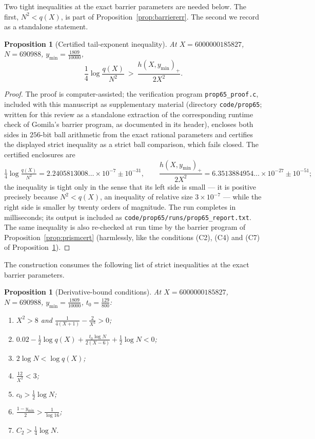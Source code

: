 \documentclass[11pt]{article}
\newtheorem{proposition}[theorem]{Proposition}
\theoremstyle{definition}
\begin{document}
Two tight inequalities at the exact barrier parameters are needed
below. The first, $N^2<q(X)$, is part of
Proposition~\ref{prop:barriererr}. The second we record as a
standalone statement.

\begin{proposition}[Certified tail-exponent inequality]\label{prop:tailexp}
At $X=6000000185827$, $N=690988$, $y_{\min}=\frac{1809}{10000}$,
\[
\frac14\log\frac{q(X)}{N^2}\ >\ \frac{h(X,y_{\min})_+}{2X^2} .
\]
\end{proposition}

\begin{proof}
The proof is computer-assisted; the verification program
\texttt{prop65\_proof.c}, included with this manuscript as
supplementary material (directory \texttt{code/prop65}; written for
this review as a standalone extraction of the corresponding runtime
check of Gomila's barrier program, as documented in its header),
encloses both sides in $256$-bit ball arithmetic from the exact
rational parameters and certifies the displayed strict inequality
as a strict ball comparison, which fails closed. The certified
enclosures are
\[
\tfrac14\log\tfrac{q(X)}{N^2}
=2.2405813008\ldots\times10^{-7}\pm10^{-31},
\qquad
\frac{h(X,y_{\min})_+}{2X^2}
=6.3513884954\ldots\times10^{-27}\pm10^{-51};
\]
the inequality is tight only in the sense that its left side is
small --- it is positive precisely because $N^2<q(X)$, an
inequality of relative size $3\times10^{-7}$ --- while the right
side is smaller by twenty orders of magnitude. The run completes in
milliseconds; its output is included as
\texttt{code/prop65/runs/prop65\_report.txt}. The same inequality
is also re-checked at run time by the barrier program of
Proposition~\ref{prop:prismcert} (harmlessly, like the conditions
(C2), (C4) and (C7) of Proposition~\ref{prop:derivgates}).
\end{proof}

The construction consumes the following list of strict inequalities
at the exact barrier parameters.

\begin{proposition}[Derivative-bound conditions]\label{prop:derivgates}
At $X=6000000185827$, $N=690988$, $y_{\min}=\frac{1809}{10000}$,
$t_0=\frac{129}{800}$:
\begin{enumerate}
\item[\textup{(C1)}] $X^2>8$ and
$\frac1{4(X+1)}-\frac2{X^3}>0$;
\item[\textup{(C2)}] $0.02-\frac12\log q(X)
+\frac{t_0\log N}{2(X-6)}+\frac12\log N<0$;
\item[\textup{(C3)}] $2\log N<\log q(X)$;
\item[\textup{(C4)}] $\frac{12}{X^2}<3$;
\item[\textup{(C5)}] $c_0>\frac12\log N$;
\item[\textup{(C6)}] $\frac{1-y_{\min}}2>\frac1{\log16}$;
\item[\textup{(C7)}] $C_2>\frac14\log N$.
\end{enumerate}
\end{proposition}
\end{document}
